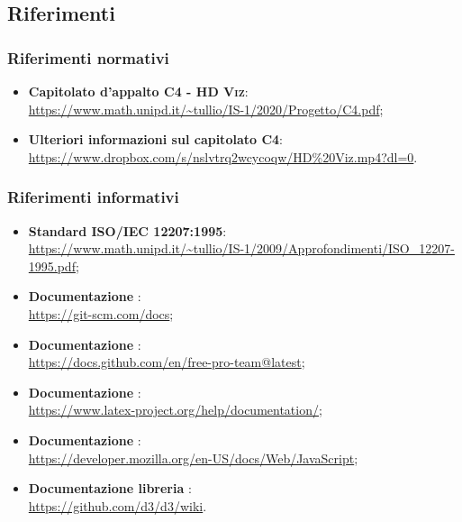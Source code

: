 \subsection{Riferimenti}
\subsubsection{Riferimenti normativi}
\begin{itemize}
    \item \textbf{Capitolato d'appalto \textsc{C4 - HD Viz}}: \\
    \url{https://www.math.unipd.it/~tullio/IS-1/2020/Progetto/C4.pdf};
    \item \textbf{Ulteriori informazioni sul capitolato C4}: \\
    \url{https://www.dropbox.com/s/nslvtrq2wcycoqw/HD\%20Viz.mp4?dl=0}.
\end{itemize}

\subsubsection{Riferimenti informativi}
\begin{itemize}
    \item \textbf{Standard ISO/IEC 12207:1995}: \\
    \url{https://www.math.unipd.it/~tullio/IS-1/2009/Approfondimenti/ISO_12207-1995.pdf};
    \item \textbf{Documentazione }: \\
    \url{https://git-scm.com/docs};
    \item \textbf{Documentazione }: \\
    \url{https://docs.github.com/en/free-pro-team@latest};
    \item \textbf{Documentazione \glossario{\LaTeX}}: \\
    \url{https://www.latex-project.org/help/documentation/};
    \item \textbf{Documentazione }: \\
    \url{https://developer.mozilla.org/en-US/docs/Web/JavaScript};
    \item \textbf{Documentazione libreria }: \\
    \url{https://github.com/d3/d3/wiki}.

\end{itemize}
